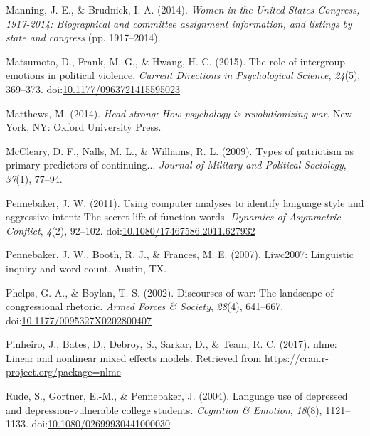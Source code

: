 \documentclass[english,,man]{apa6}
\begin{document}
\leavevmode\hypertarget{ref-Manning2014}{}%
Manning, J. E., \& Brudnick, I. A. (2014). \emph{Women in the United States Congress, 1917-2014: Biographical and committee assignment information, and listings by state and congress} (pp. 1917--2014).

\leavevmode\hypertarget{ref-Matsumoto2015}{}%
Matsumoto, D., Frank, M. G., \& Hwang, H. C. (2015). The role of intergroup emotions in political violence. \emph{Current Directions in Psychological Science}, \emph{24}(5), 369--373. doi:\href{https://doi.org/10.1177/0963721415595023}{10.1177/0963721415595023}

\leavevmode\hypertarget{ref-Matthews2014}{}%
Matthews, M. (2014). \emph{Head strong: How psychology is revolutionizing war}. New York, NY: Oxford University Press.

\leavevmode\hypertarget{ref-McCleary2009}{}%
McCleary, D. F., Nalls, M. L., \& Williams, R. L. (2009). Types of patriotism as primary predictors of continuing... \emph{Journal of Military and Political Sociology}, \emph{37}(1), 77--94.

\leavevmode\hypertarget{ref-Pennebaker2011}{}%
Pennebaker, J. W. (2011). Using computer analyses to identify language style and aggressive intent: The secret life of function words. \emph{Dynamics of Asymmetric Conflict}, \emph{4}(2), 92--102. doi:\href{https://doi.org/10.1080/17467586.2011.627932}{10.1080/17467586.2011.627932}

\leavevmode\hypertarget{ref-Pennebaker2007}{}%
Pennebaker, J. W., Booth, R. J., \& Frances, M. E. (2007). Liwc2007: Linguistic inquiry and word count. Austin, TX.

\leavevmode\hypertarget{ref-Phelps2002}{}%
Phelps, G. A., \& Boylan, T. S. (2002). Discourses of war: The landscape of congressional rhetoric. \emph{Armed Forces \& Society}, \emph{28}(4), 641--667. doi:\href{https://doi.org/10.1177/0095327X0202800407}{10.1177/0095327X0202800407}

\leavevmode\hypertarget{ref-Pinheiro2017}{}%
Pinheiro, J., Bates, D., Debroy, S., Sarkar, D., \& Team, R. C. (2017). nlme: Linear and nonlinear mixed effects models. Retrieved from \url{https://cran.r-project.org/package=nlme}

\leavevmode\hypertarget{ref-Rude2004}{}%
Rude, S., Gortner, E.-M., \& Pennebaker, J. (2004). Language use of depressed and depression-vulnerable college students. \emph{Cognition \& Emotion}, \emph{18}(8), 1121--1133. doi:\href{https://doi.org/10.1080/02699930441000030}{10.1080/02699930441000030}
\end{document}
